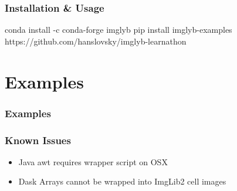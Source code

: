 \documentclass[aspectratio=169]{beamer}
\begin{document}
\begin{frame}
    \frametitle{Installation \& Usage}
    conda install -c conda-forge imglyb
    pip install imglyb-examples
    https://github.com/hanslovsky/imglyb-learnathon
\end{frame}

\section{Examples}
\begin{frame}
    \frametitle{Examples}
    
\end{frame}

\begin{frame}
    \frametitle{Known Issues}
    \begin{itemize}
          \item Java awt requires wrapper script on OSX
          \item Dask Arrays cannot be wrapped into ImgLib2 cell images
    \end{itemize}
\end{frame}
\end{document}
